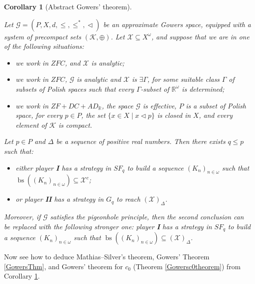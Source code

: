 \documentclass[a4paper,11pt]{article}
\newtheorem{cor}[thm]{Corollary}
\theoremstyle{definition}
\numberwithin{equation}{section}
\newcommand{\R}{\mathbb{R}}
\newcommand{\X}{\mathcal{X}}
\newcommand{\G}{\mathcal{G}}
\newcommand{\I}{\textbf{I}}
\newcommand{\II}{\textbf{II}}
\newcommand{\K}{\mathcal{K}}
\DeclareMathOperator{\bs}{bs}
\begin{document}
\begin{cor}[Abstract Gowers' theorem]\label{AbstractGowers}

Let $\G = (P, X, d, \leqslant, \leqslant^*, \vartriangleleft)$ be an approximate Gowers space, equipped with a system of precompact sets $(\K, \oplus)$. Let $\X \subseteq X^\omega$, and suppose that we are in one of the following situations:

\begin{itemize}

\item we work in $ZFC$, and $\X$ is analytic;

\item we work in $ZFC$, $\G$ is analytic and $\X$ is $\exists \Gamma$, for some suitable class $\Gamma$ of subsets of Polish spaces such that every $\Gamma$-subset of $\R^\omega$ is determined;

\item we work in $ZF + DC + AD_\R$, the space $\G$ is effective, $P$ is a subset of Polish space, for every $p \in P$, the set $\{x \in X \mid x \vartriangleleft p\}$ is closed in $X$, and every element of $\K$ is compact.

\end{itemize}

\noindent Let $p \in P$ and $\Delta$ be a sequence of positive real numbers. Then there exists $q \leqslant p$ such that:

\begin{itemize}

\item either player \I{} has a strategy in $SF_q$ to build a sequence $(K_n)_{n \in \omega}$ such that $\bs((K_n)_{n \in \omega}) \subseteq \X^c$;

\item or player \II{} has a strategy in $G_q$ to reach $(\X)_\Delta$.

\end{itemize}

\noindent Moreover, if $\G$ satisfies the pigeonhole principle, then the second conclusion can be replaced with the following stronger one: player \I{} has a strategy in $SF_q$ to build a sequence $(K_n)_{n \in \omega}$ such that $\bs((K_n)_{n \in \omega}) \subseteq (\X)_\Delta$.

\end{cor}

Now see how to deduce Mathias--Silver's theorem, Gowers' Theorem \ref{GowersThm}, and Gowers' theorem for $c_0$ (Theorem \ref{Gowersc0theorem}) from Corollary \ref{AbstractGowers}.
\end{document}
